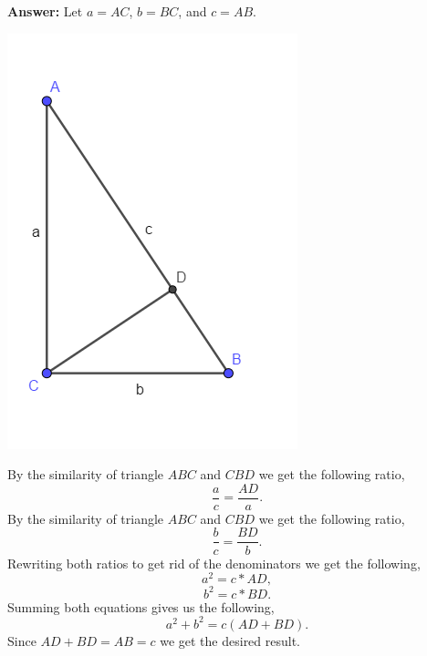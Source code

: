\documentclass[12pt]{article}
\theoremstyle{homework}
\begin{document}
\begin{enumerate}
\begin{enumerate}
  \textbf{Answer:} Let $a = AC$, $b = BC$, and $c = AB$. 
  \begin{center}
    \includegraphics[width = .50\textwidth]{triangle2.png}      
     \end{center}
  
  
  
  
  
  
  
  By the similarity of triangle $ABC$ and $CBD$ we get the following ratio, 
  \begin{equation*}
    \frac{a}{c} = \frac{AD}{a}.
  \end{equation*}
  By the similarity of triangle $ABC$ and $CBD$ we get the following ratio, 
  \begin{equation*}
    \frac{b}{c} = \frac{BD}{b}.
  \end{equation*}
  Rewriting both ratios to get rid of the denominators we get the following, 
  \begin{equation*}
    a^2 = c*AD,
  \end{equation*}
  \begin{equation*}
    b^2 = c*BD.
  \end{equation*}
Summing both equations gives us the following, 
\begin{equation*}
  a^2 + b^2 = c(AD + BD).
\end{equation*}
Since $AD + BD = AB = c$ we get the desired result.


\end{enumerate}




\end{enumerate}
\vspace{.5in}
\end{document}
